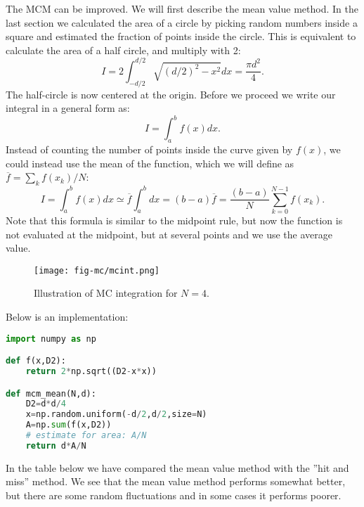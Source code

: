 \documentclass[graybox,sectrefs,envcountresetchap,open=right,final]{svmonodo}
\begin{document}
The MCM can be improved. We will first describe the mean value method.
In the last section we calculated the area of
a circle by picking random numbers inside a square and estimated the
fraction of points inside the circle. This is equivalent to calculate
the area of a half circle, and multiply with 2:
\begin{equation}
I=2\int_{-d/2}^{d/2}\sqrt{(d/2)^2-x^2}dx=\frac{\pi d^2}{4}.
\label{eq:mc:Is}
\end{equation}
The half-circle is now centered at the origin. Before we proceed we
write our integral in a general form as:
\begin{equation}
I=\int_a^bf(x)dx.
\label{eq:mc:I1}
\end{equation}
Instead of counting the number of points inside the curve given by
$f(x)$, we could instead use the mean of
the function, which we will define as $\overline{f}=\sum_k f(x_k)/N$:
\begin{equation}
I=\int_a^bf(x)dx\simeq\overline{f}\int_a^bdx=(b-a)\overline{f}
=\frac{(b-a)}{N}\sum_{k=0}^{N-1}f(x_k).
\label{eq:mc:I2}
\end{equation}
Note that this formula is similar to the midpoint rule, but now the
function is not evaluated at the midpoint, but at several points and
we use the average value. 

\begin{figure}[!ht]  %
  \centerline{\texttt{[image: fig-mc/mcint.png]}}
  \caption{
  Illustration of MC integration for $N=4$. \label{fig:mc:int}
  }
\end{figure}

Below is an implementation:












\begin{lstlisting}[language=python,style=blue1]
import numpy as np

def f(x,D2):
    return 2*np.sqrt((D2-x*x))

def mcm_mean(N,d):
    D2=d*d/4
    x=np.random.uniform(-d/2,d/2,size=N)
    A=np.sum(f(x,D2))
    # estimate for area: A/N
    return d*A/N

\end{lstlisting}


In the table below we have compared the mean value method with the
''hit and miss'' method. We see
that the mean value method performs somewhat better, but there are
some random fluctuations and in some cases it performs poorer. 
\end{document}
